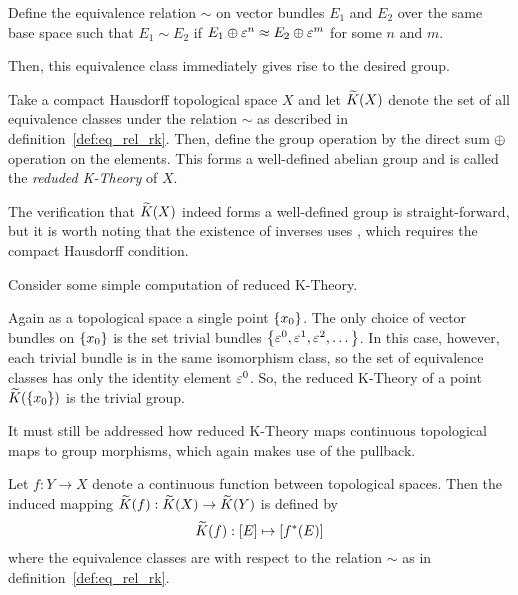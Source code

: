 \documentclass[../sean_thesis.tex]{subfiles}
\begin{document}
\begin{definition}
	\label{def:eq_rel_rk}
	Define the equivalence relation $\sim$ on vector bundles $E_1$ and $E_2$ over the same base space such that $E_1 \sim E_2$ if $E_1 \oplus \varepsilon^{n} \approx E_2 \oplus \varepsilon^{m}$ for some $n$ and $m$. 
\end{definition}

Then, this equivalence class immediately gives rise to the desired group.

\begin{definition}
	Take a compact Hausdorff topological space $X$ and let $\widetilde{K}(X)$ denote the set of all equivalence classes under the relation $\sim$ as described in definition~\ref{def:eq_rel_rk}. Then, define the group operation by the direct sum $\oplus$ operation on the elements. This forms a well-defined abelian group and is called the \emph{reduded K-Theory} of $X$.
\end{definition}

The verification that $\widetilde{K}(X)$ indeed forms a well-defined group is straight-forward, but it is worth noting that the existence of inverses uses , which requires the compact Hausdorff condition.

Consider some simple computation of reduced K-Theory.

\begin{example}
	Again as a topological space a single point $\left\{x_0\right\}$. The only choice of vector bundles on $\left\{x_0\right\}$ is the set trivial bundles $\left\{\varepsilon^{0}, \varepsilon^{1}, \varepsilon^{2}, \dots\right\}$. In this case, however, each trivial bundle is in the same isomorphism class, so the set of equivalence classes has only the identity element $\varepsilon^{0}$. So, the reduced K-Theory of a point $\widetilde{K}(\left\{x_0\right\})$ is the trivial group.
\end{example}

It must still be addressed how reduced K-Theory maps continuous topological maps to group morphisms, which again makes use of the pullback.

\begin{definition}
	Let $f: Y \to X$ denote a continuous function between topological spaces. Then the induced mapping $\widetilde{K}(f): \widetilde{K}(X) \to \widetilde{K}(Y)$ is defined by
	\begin{equation*}
		\widetilde{K}(f): [E] \mapsto [f^{*}(E)]
	\end{equation*}
	where the equivalence classes are with respect to the relation $\sim$ as in definition~\ref{def:eq_rel_rk}.
\end{definition}
\end{document}

